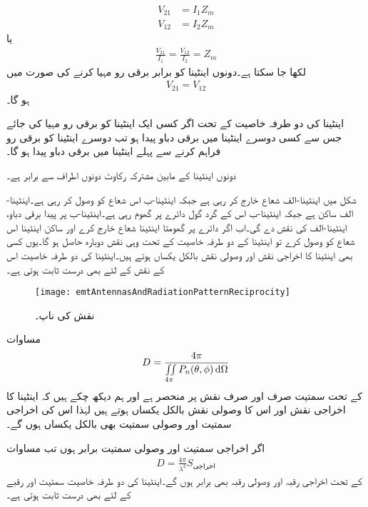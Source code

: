 \begin{align*}
V_{21}&=I_1 Z_m\\
V_{12}&=I_2 Z_m
\end{align*}
یا
\begin{align}
\frac{V_{21}}{I_1}=\frac{V_{12}}{I_2}=Z_m
\end{align}
لکھا جا سکتا ہے۔دونوں اینٹینا کو  برابر برقی رو  مہیا کرنے کی صورت میں
\begin{align}
V_{21}=V_{12}
\end{align}
ہو گا۔

اینٹینا کی دو طرفہ خاصیت کے تحت اگر کسی ایک اینٹینا کو برقی رو  مہیا کی جائے جس سے کسی دوسرے اینٹینا میں برقی دباو  پیدا ہو تب دوسرے اینٹینا کو برقی رو  فراہم کرنے سے پہلے اینٹینا میں برقی دباو  پیدا ہو گا۔

دونوں اینٹینا کے مابین مشترکہ رکاوٹ  دونوں اطراف سے برابر ہے۔

شکل  میں اینٹینا-الف شعاع خارج کر رہی ہے جبکہ اینٹینا-ب اس شعاع کو وصول کر رہی ہے۔اینٹینا-الف ساکن ہے جبکہ اینٹینا-ب اس کے گرد گول دائرے پر گھوم رہی ہے۔اینٹینا-ب پر پیدا برقی دباو، اینٹینا-الف کی نقش دے گی۔اب اگر دائرے پر گھومتا اینٹینا شعاع خارج کرے اور ساکن اینٹینا اس شعاع کو وصول کرے تو اینٹینا کے دو طرفہ خاصیت کے تحت وہی نقش دوبارہ حاصل ہو گا۔یوں کسی بھی اینٹینا کا اخراجی نقش اور وصولی نقش بالکل یکساں ہوتے ہیں۔اینٹینا کی دو طرفہ خاصیت اس کے نقش کے لئے بھی درست ثابت ہوتی ہے۔
\begin{figure}
\centering
\texttt{[image: emtAntennasAndRadiationPatternReciprocity]}
\caption{نقش کی ناپ۔}
\label{شکل_اینٹینا_نقش_ناپ}
\end{figure}
مساوات 
\begin{align}
D=\frac{4\pi}{\iint \limits_{4\pi} P_n(\theta,\phi) \dif \Omega}
\end{align}
کے تحت سمتیت صرف اور صرف نقش پر منحصر ہے اور ہم دیکھ چکے ہیں کہ اینٹینا کا اخراجی نقش اور اس کا وصولی نقش بالکل یکساں ہوتے ہیں لہٰذا اس کی اخراجی سمتیت اور وصولی سمتیت بھی بالکل یکساں ہوں گے۔

اگر اخراجی سمتیت اور  وصولی سمتیت برابر ہوں تب مساوات 
\begin{align}
D=\frac{4\pi}{\lambda^2} S_{\text{اخراجی}}
\end{align}
کے تحت اخراجی رقبہ اور وصولی رقبہ بھی برابر ہوں گے۔اینٹینا کی دو طرفہ خاصیت سمتیت اور رقبے کے لئے بھی درست ثابت ہوتی ہے۔

